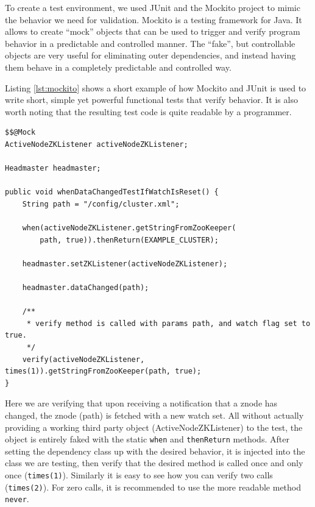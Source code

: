To create a test environment, we used JUnit and the Mockito project to mimic the behavior we need for validation.
Mockito is a testing framework for Java. It allows to create ``mock'' objects that can be used to trigger and verify program behavior in a predictable and controlled manner. The ``fake'', but controllable objects are very useful for eliminating outer dependencies, and instead having them behave in a completely predictable and controlled way.

Listing \ref{lst:mockito} shows a short example of how Mockito and JUnit is used to write short, simple yet powerful functional tests that verify behavior. It is also worth noting that the resulting test code is quite readable by a programmer.

\begin{lstlisting}[style=customjava,label=lst:mockito,caption={Test code utilizing Mockito. Think of the \texttt{@Mock} class as a subclass with all methods overrided \texttt{return null;}.}]
$$@Mock
ActiveNodeZKListener activeNodeZKListener;

Headmaster headmaster;

public void whenDataChangedTestIfWatchIsReset() {
    String path = "/config/cluster.xml";

    when(activeNodeZKListener.getStringFromZooKeeper(
    	path, true)).thenReturn(EXAMPLE_CLUSTER);

    headmaster.setZKListener(activeNodeZKListener);

    headmaster.dataChanged(path);

    /** 
     * verify method is called with params path, and watch flag set to true.
     */
    verify(activeNodeZKListener, times(1)).getStringFromZooKeeper(path, true);
}

\end{lstlisting}

Here we are verifying that upon receiving a notification that a znode has changed, the znode (path) is fetched with a new watch set.
All without actually providing a working third party object (ActiveNodeZKListener) to the test, the object is entirely faked with the static \texttt{when} and \texttt{thenReturn} methods. After setting the dependency class up with the desired behavior, it is injected into the class we are testing, then verify that the desired method is called once and only once (\texttt{times(1)}). Similarly it is easy to see how you can verify two calls (\texttt{times(2)}). For zero calls, it is recommended to use the more readable method \texttt{never}.
